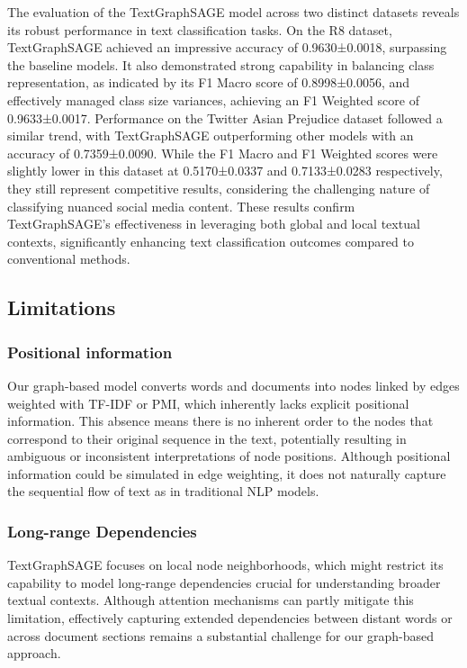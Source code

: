 \documentclass{article}
\begin{document}
The evaluation of the TextGraphSAGE model across two distinct datasets reveals its robust performance in text classification tasks. On the R8 dataset, TextGraphSAGE achieved an impressive accuracy of 0.9630±0.0018, surpassing the baseline models. It also demonstrated strong capability in balancing class representation, as indicated by its F1 Macro score of 0.8998±0.0056, and effectively managed class size variances, achieving an F1 Weighted score of 0.9633±0.0017. Performance on the Twitter Asian Prejudice dataset followed a similar trend, with TextGraphSAGE outperforming other models with an accuracy of 0.7359±0.0090. While the F1 Macro and F1 Weighted scores were slightly lower in this dataset at 0.5170±0.0337 and 0.7133±0.0283 respectively, they still represent competitive results, considering the challenging nature of classifying nuanced social media content. These results confirm TextGraphSAGE's effectiveness in leveraging both global and local textual contexts, significantly enhancing text classification outcomes compared to conventional methods.



\subsection{Limitations}
\subsubsection{Positional information}
Our graph-based model converts words and documents into nodes linked by edges weighted with TF-IDF or PMI, which inherently lacks explicit positional information. This absence means there is no inherent order to the nodes that correspond to their original sequence in the text, potentially resulting in ambiguous or inconsistent interpretations of node positions. Although positional information could be simulated in edge weighting, it does not naturally capture the sequential flow of text as in traditional NLP models.

\subsubsection{Long-range Dependencies}

TextGraphSAGE focuses on local node neighborhoods, which might restrict its capability to model long-range dependencies crucial for understanding broader textual contexts. Although attention mechanisms can partly mitigate this limitation, effectively capturing extended dependencies between distant words or across document sections remains a substantial challenge for our graph-based approach.
\end{document}
